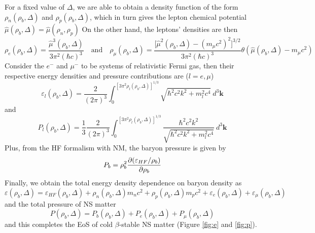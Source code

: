 For a fixed value of $\Delta$, we are able to obtain a density function of the form $\rho_n (\rho_b, \Delta)$ and $\rho_p (\rho_b, \Delta)$, which in turn gives the lepton chemical potential $\hat{\mu}(\rho_b,\Delta) = \hat{\mu}(\rho_n,\rho_p)$ On the other hand, the leptons' densities are then
\begin{equation}
        \rho_e(\rho_b,\Delta) = \frac{ \hat{\mu}^3(\rho_b,\Delta)}{ 3\pi^2 (\hbar c)^3} \quad\text{and}\quad \rho_\mu(\rho_b,\Delta) = \frac{ \Big[\hat{\mu}^2(\rho_b,\Delta) - (m_\mu c^2)^2\Big]^{3/2}}{ 3\pi^2 (\hbar c)^3} \theta(\hat{\mu}(\rho_b,\Delta)-m_\mu c^2)
\end{equation} 
Consider the $e^-$ and $\mu^-$ to be systems of relativistic Fermi gas, then their respective energy densities and pressure contributions are ($l=e,\mu$)
\begin{equation}
        \varepsilon_l(\rho_b,\Delta) = \frac{ 2}{ (2\pi)^3} \int_{{0}}^{{[3\pi^2\rho_l(\rho_b,\Delta)]^{1/3}}} {\sqrt{\hbar^2 c^2 k^2 + m_l^2 c^4}} \: d^3{\mathbf{k}}
\end{equation} 
and
\begin{equation}
        P_l(\rho_b,\Delta) = \frac{ 1}{ 3} \frac{ 2}{ (2\pi)^3} \int_{{0}}^{{[3\pi^2 \rho_l(\rho_b,\Delta)]^{1/3}}} { \frac{ \hbar^2 c^2 k^2}{ \sqrt{\hbar^2 c^2 k^2 + m_l^2 c^4}} } \: d^3{\mathbf{k}}
\end{equation} 
Plus, from the \gls{HF} formalism with \gls{NM}, the baryon pressure is given by
\begin{equation}
        P_b = \rho_b^2 \pdv{(\varepsilon_{HF}/\rho_b)}{\rho_b}
\end{equation}
Finally, we obtain the total energy density dependence on baryon density as 
\begin{equation}
        \varepsilon(\rho_b,\Delta) = \varepsilon_{HF}(\rho_b,\Delta) + \rho_n(\rho_b,\Delta)m_n c^2 + \rho_p(\rho_b,\Delta)m_p c^2 + \varepsilon_e(\rho_b,\Delta) + \varepsilon_\mu(\rho_b,\Delta)
\end{equation}
and the total pressure of \gls{NS} matter
\begin{equation}
        P(\rho_b,\Delta) = P_b(\rho_b,\Delta) + P_e(\rho_b,\Delta) + P_\mu(\rho_b,\Delta)
\end{equation}
and this completes the \gls{EoS} of cold $\beta$-stable \gls{NS} matter (Figure \ref{fig:e} and \ref{fig:p}).
